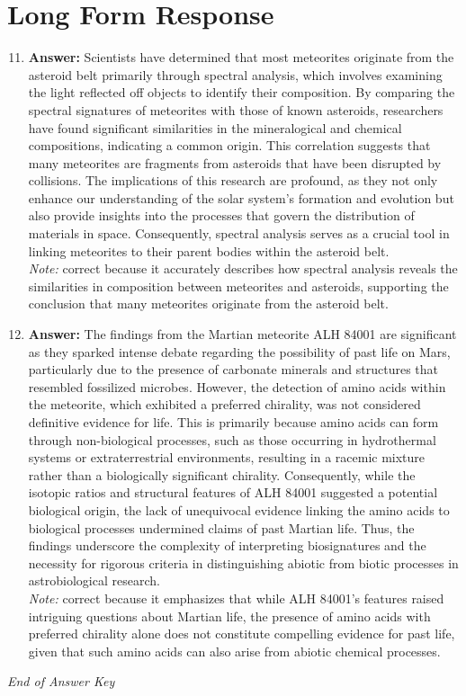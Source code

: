 \documentclass[12pt]{article}
\begin{document}
\section*{Long Form Response}
\begin{enumerate}[label=\arabic*.]
\setcounter{enumi}{10}
\item \textbf{Answer:} Scientists have determined that most meteorites originate from the asteroid belt primarily through spectral analysis, which involves examining the light reflected off objects to identify their composition. By comparing the spectral signatures of meteorites with those of known asteroids, researchers have found significant similarities in the mineralogical and chemical compositions, indicating a common origin. This correlation suggests that many meteorites are fragments from asteroids that have been disrupted by collisions. The implications of this research are profound, as they not only enhance our understanding of the solar system's formation and evolution but also provide insights into the processes that govern the distribution of materials in space. Consequently, spectral analysis serves as a crucial tool in linking meteorites to their parent bodies within the asteroid belt.
\\ \textit{Note:} correct because it accurately describes how spectral analysis reveals the similarities in composition between meteorites and asteroids, supporting the conclusion that many meteorites originate from the asteroid belt.
\item \textbf{Answer:} The findings from the Martian meteorite ALH 84001 are significant as they sparked intense debate regarding the possibility of past life on Mars, particularly due to the presence of carbonate minerals and structures that resembled fossilized microbes. However, the detection of amino acids within the meteorite, which exhibited a preferred chirality, was not considered definitive evidence for life. This is primarily because amino acids can form through non-biological processes, such as those occurring in hydrothermal systems or extraterrestrial environments, resulting in a racemic mixture rather than a biologically significant chirality. Consequently, while the isotopic ratios and structural features of ALH 84001 suggested a potential biological origin, the lack of unequivocal evidence linking the amino acids to biological processes undermined claims of past Martian life. Thus, the findings underscore the complexity of interpreting biosignatures and the necessity for rigorous criteria in distinguishing abiotic from biotic processes in astrobiological research.
\\ \textit{Note:} correct because it emphasizes that while ALH 84001's features raised intriguing questions about Martian life, the presence of amino acids with preferred chirality alone does not constitute compelling evidence for past life, given that such amino acids can also arise from abiotic chemical processes.
\end{enumerate}

\vfill
\noindent\textit{End of Answer Key}
\end{document}
